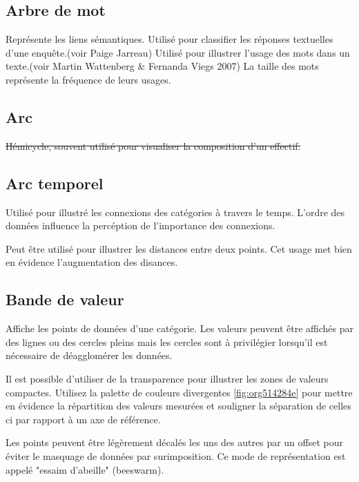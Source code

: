 \documentclass[a4paper,12pt]{article}
\begin{document}
\begin{multicols}{2}
\subsection*{Arbre de mot}
\label{sec:org4232eec}
Représente les liens sémantiques. Utilisé pour classifier les réponses textuelles d'une enquête.(voir Paige Jarreau) Utilisé pour illustrer l'usage des mots dans un texte.(voir Martin Wattenberg \& Fernanda Viegs 2007) La taille des mots représente la fréquence de leurs usages. \autocite{jonathanschwabishQualitative2021}
\subsection*{Arc}
\label{sec:orge14f18c}
\sout{Hémicycle, souvent utilisé pour visualiser la composition d'un effectif.}
\subsection*{Arc temporel}
\label{sec:org7ea74ac}
Utilisé pour illustré les connexions des catégories à travers le temps. L'ordre des données influence la percéption de l'importance des connexions. \autocite{jonathanschwabishRelationship2021}

Peut être utilisé pour illustrer les distances entre deux points. Cet usage met bien en évidence l'augmentation des disances. \autocite{jonathanschwabishRelationship2021}
\subsection*{Bande de valeur}
\label{sec:orgcfed620}
Affiche les points de données d'une catégorie.\autocite{jonathanschwabishDistribution2021} Les valeurs peuvent être affichés par des lignes ou des cercles pleins mais les cercles sont à privilégier lorsqu'il est nécessaire de déagglomérer les données.

Il est possible d'utiliser de la transparence pour illustrer les zones de valeurs compactes. \autocite{jonathanschwabishDistribution2021} Utilisez la palette de couleurs divergentes \ref{fig:org514284e} pour mettre en évidence la répartition des valeurs mesurées et souligner la séparation de celles ci par rapport à un axe de référence.\autocite{jonathanschwabishDistribution2021}

Les points peuvent être légèrement décalés les uns des autres par un offset pour éviter le masquage de données par surimposition. Ce mode de représentation est appelé "essaim d'abeille" (beeswarm). \autocite{jonathanschwabishDistribution2021}


\end{multicols}
\end{document}

